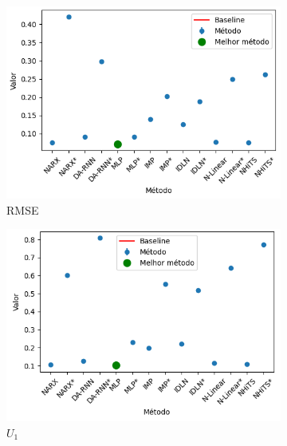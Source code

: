 \begin{figure}[htbp]
	\begin{subfigure}[b]{0.3\textwidth}
		\centering
		\includegraphics[width=\textwidth]{figuras/rmse_takens_brasil_oil_results_test.png}
		\caption{\ac{RMSE}}
		\label{fig:rmse_takens_brasil_oil_results_test}
	\end{subfigure}
	\hfill
	\begin{subfigure}[b]{0.3\textwidth}
		\centering
		\includegraphics[width=\textwidth]{figuras/u1_takens_brasil_oil_results_test.png}
		\caption{\(U_1\)}
		\label{fig:u1_takens_brasil_oil_results_test}
	\end{subfigure}
	\hfill
	\begin{subfigure}[b]{0.3\textwidth}
		\centering

\end{subfigure}
\end{figure}
